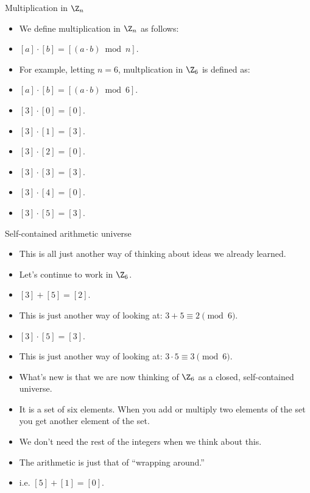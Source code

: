 \documentclass{beamer}
\begin{document}
\begin{frame}{Multiplication in $\Z_n$}

\begin{itemize}
  \item We define multiplication in $\Z_n$ as follows:
  \item $[a] \cdot [b] = [(a\cdot b) \bmod n]$.
  \item For example, letting $n=6$, multplication in $\Z_6$ is defined as:
  \item $[a] \cdot [b] = [(a\cdot b) \bmod 6]$.
  \item $[3] \cdot [0] = [0]$.
  \item $[3] \cdot [1] = [3]$.
  \item $[3] \cdot [2] = [0]$.
  \item $[3] \cdot [3] = [3]$.
  \item $[3] \cdot [4] = [0]$.
  \item $[3] \cdot [5] = [3]$.
\end{itemize}

\end{frame}

\begin{frame}{Self-contained arithmetic universe}

\begin{itemize}
  \item This is all just another way of thinking about ideas we already learned.
  \item Let's continue to work in $\Z_6$.
  \item $[3] + [5] = [2]$.
  \item This is just another way of looking at: $3+5 \equiv 2 \pmod 6$.
  \item $[3] \cdot [5] = [3]$.
  \item This is just another way of looking at: $3\cdot 5 \equiv 3 \pmod 6$.
  \item What's new is that we are now thinking of $\Z_6$ as a closed, self-contained universe.
  \item It is a set of six elements. When you add or multiply two elements of the
  set you get another element of the set.
  \item We don't need the rest of the integers when we think about this.
  \item The arithmetic is just that of ``wrapping around.''
  \item i.e. $[5] + [1] = [0]$.
\end{itemize}

\end{frame}
\end{document}
